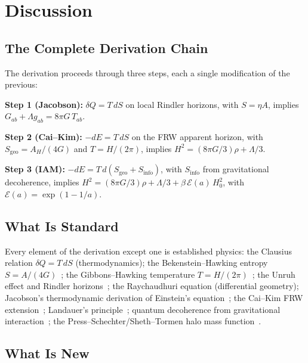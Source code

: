 \documentclass[11pt]{article}
\begin{document}
\section{Discussion}
\label{sec:discussion}

\subsection{The Complete Derivation Chain}

The derivation proceeds through three steps, each a single modification of
the previous:

\textbf{Step 1 (Jacobson):} $\delta Q = T\,dS$ on local Rindler horizons,
with $S = \eta A$, implies
$G_{ab} + \Lambda g_{ab} = 8\pi G\,T_{ab}$.

\textbf{Step 2 (Cai--Kim):} $-dE = T\,dS$ on the FRW apparent horizon,
with $S_\mathrm{geo} = A_H/(4G)$ and $T = H/(2\pi)$, implies
$H^2 = (8\pi G/3)\rho + \Lambda/3$.

\textbf{Step 3 (IAM):} $-dE = T\,d(S_\mathrm{geo} + S_\mathrm{info})$,
with $S_\mathrm{info}$ from gravitational decoherence, implies
$H^2 = (8\pi G/3)\rho + \Lambda/3 + \beta\,\mathcal{E}(a)\,H_0^2$, with
$\mathcal{E}(a) = \exp(1-1/a)$.

\subsection{What Is Standard}

Every element of the derivation except one is established physics:
the Clausius relation $\delta Q = T\,dS$ (thermodynamics);
the Bekenstein--Hawking entropy $S = A/(4G)$~\citep{Bekenstein1973,Hawking1975};
the Gibbons--Hawking temperature $T = H/(2\pi)$~\citep{GibbonsHawking1977};
the Unruh effect and Rindler horizons~\citep{Unruh1976};
the Raychaudhuri equation (differential geometry);
Jacobson's thermodynamic derivation of Einstein's equation~\citep{Jacobson1995};
the Cai--Kim FRW extension~\citep{CaiKim2005};
Landauer's principle~\citep{Landauer1961};
quantum decoherence from gravitational interaction~\citep{Zurek2003};
the Press--Schechter/Sheth--Tormen halo mass
function~\citep{Press1974,ShethTormen1999}.

\subsection{What Is New}
\end{document}
